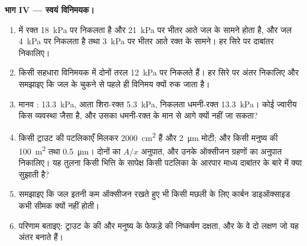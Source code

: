 \begin{problem}
\medskip
\noindent\textbf{भाग IV --- स्वयं विनिमयक।}
\begin{enumerate}[resume]
  \item {}  में रक्त \qty{18}{kPa} पर निकलता है और
        \qty{21}{kPa} पर भीतर आते जल के सामने होता है, और जल
        \qty{4}{kPa} पर निकलता है तथा \qty{3}{kPa} पर भीतर आते रक्त के
        सामने। हर सिरे पर दाबांतर निकालिए।
  \item किसी सहधारा विनिमयक में दोनों तरल \qty{12}{kPa} पर निकलते हैं।
        हर सिरे पर अंतर निकालिए और समझाइए कि जल के चुकने से पहले ही
        विनिमय क्यों रुक जाता है।
  \item मानव :  \qty{13.3}{kPa}, आता शिरा-रक्त
        \qty{5.3}{kPa}, निकलता धमनी-रक्त \qty{13.3}{kPa}।
        कोई ज्वारीय  किस व्यवस्था जैसा है, और उसका धमनी-रक्त
         के मान से आगे क्यों नहीं जा सकता?
  \item किसी ट्राउट की पटलिकाएँ मिलकर \qty{2000}{cm^2} हैं और
        \qty{2}{\micro m} मोटी; और किसी मनुष्य की 
        \qty{100}{m^2} तथा \qty{0.5}{\micro m}।
        दोनों का $A/x$ अनुपात, और उनके ऑक्सीजन ग्रहणों का अनुपात
        निकालिए। यह तुलना किसी  भित्ति के सापेक्ष किसी पटलिका के
        आरपार माध्य दाबांतर के बारे में क्या सुझाती है?
  \item समझाइए कि जल इतनी कम ऑक्सीजन रखते हुए भी किसी मछली के लिए
        कार्बन डाइऑक्साइड कभी सीमक क्यों नहीं होती।
  \item परिणाम बताइए: ट्राउट के  की और मनुष्य के फेफड़े की
        निष्कर्षण दक्षता, और  के वे दो लक्षण जो यह अंतर बनाते हैं।
\end{enumerate}
\end{problem}
